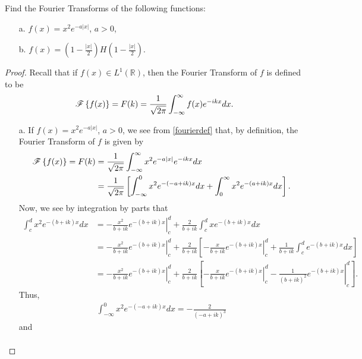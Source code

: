 \begin{problem}{1}
  Find the Fourier Transforms of the following functions:
  \begin{enumerate}
    \item[a.] $f(x) = x^2 e^{-a|x|}$, $a > 0$,
    \item[b.] $\displaystyle f(x) = \left(1 - \frac{|x|}{2}\right)H\left(1 - \frac{|x|}{2}\right)$.
  \end{enumerate}
\end{problem}

\begin{proof}
  Recall that if $f(x) \in L^1(\mathbb{R})$, then the Fourier Transform of $f$ is
  defined to be
  \begin{align}\label{fourierdef}
    \mathscr{F}\left\{ {f(x)} \right\} = F(k) = \frac{1}{\sqrt{2\pi}}\int_{-\infty}^\infty f(x) e^{-ikx} dx.
  \end{align}
  \begin{enumerate}
    \item[a.] If $f(x) = x^2 e^{-a|x|}$, $a > 0$, we see from \eqref{fourierdef}
      that, by definition, the Fourier Transform of $f$ is given by
      \begin{align*}
        \mathscr{F}\left\{ {f(x)} \right\} = F(k) &= \frac{1}{\sqrt{2\pi}}\int_{-\infty}^\infty x^2 e^{-a|x|} e^{-ikx} dx \\
        &= \frac{1}{\sqrt{2\pi}}\left[\int_{-\infty}^0 x^2 e^{-(-a+ik)x} dx + \int_{0}^\infty x^2 e^{-(a+ik)x} dx\right].
      \end{align*}
      Now, we see by integration by parts that
      \begin{align*}
        \int_c^d x^2 e^{-(b+ik)x}dx
        &= \left.-\frac{x^2}{b+ik}e^{-(b+ik)x}\right\rvert_c^d + \frac{2}{b+ik}\int_c^d x e^{-(b+ik)x}dx \\
        &= \left.-\frac{x^2}{b+ik}e^{-(b+ik)x}\right\rvert_c^d + \frac{2}{b+ik}\left[\left.-\frac{x}{b+ik}e^{-(b+ik)x}\right\rvert_c^d + \frac{1}{b+ik}\int_c^d e^{-(b+ik)x}dx\right]\\
        &=\left.-\frac{x^2}{b+ik}e^{-(b+ik)x}\right\rvert_c^d + \frac{2}{b+ik}\left[\left.-\frac{x}{b+ik}e^{-(b+ik)x}\right\rvert_c^d - \left.\frac{1}{(b+ik)^2}e^{-(b+ik)x}\right\rvert_c^d\right].
      \end{align*}
      Thus,
      \begin{align*}
        \int_{-\infty}^0 x^2 e^{-(-a+ik)x} dx = -\frac{2}{(-a+ik)^3}
      \end{align*}
      and
      \begin{align*}

\end{align*}
\end{enumerate}
\end{proof}
